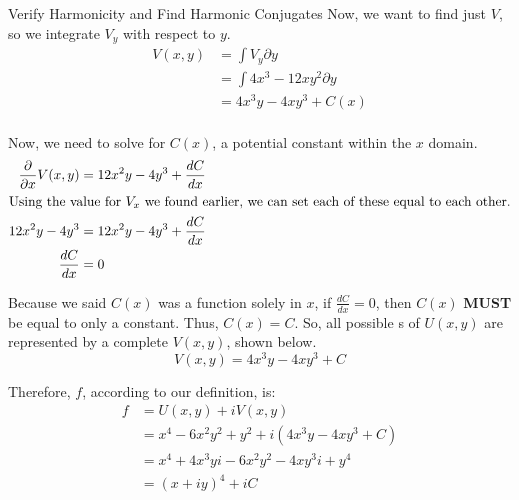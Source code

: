 \begin{example}{Verify Harmonicity and Find Harmonic Conjugates}
  Now, we want to find just $V$, so we integrate $V_{y}$ with respect to $y$.
  \begin{align*}
    V(x, y) &= \int V_{y} \partial y \\
            &= \int 4x^{3} - 12xy^{2} \partial y \\
            &= 4x^{3}y - 4xy^{3} + C(x) \\
  \end{align*}

  Now, we need to solve for $C(x)$, a potential constant within the $x$ domain.
  \begin{align*}
    \frac{\partial}{\partial x} V(x, y) &= 12x^{2}y - 4y^{3} + \frac{dC}{dx} \\
    \intertext{Using the value for $V_{x}$ we found earlier, we can set each of these equal to each other.}
    12x^{2}y - 4y^{3} &= 12x^{2}y - 4y^{3} + \frac{dC}{dx} \\
    \frac{dC}{dx} &= 0
  \end{align*}

  Because we said $C(x)$ was a function solely in $x$, if $\frac{dC}{dx} = 0$, then $C(x)$ \textbf{MUST} be equal to only a constant.
  Thus, $C(x) = C$.
  So, all possible s of $U(x, y)$ are represented by a complete $V(x, y)$, shown below.
  \begin{equation*}
    V(x, y) = 4x^{3}y - 4xy^{3} + C
  \end{equation*}

  Therefore, $f$, according to our definition, is:
  \begin{align*}
    f &= U(x, y) + iV(x, y) \\
      &= x^{4} - 6x^{2}y^{2} + y^{2} + i \left( 4x^{3}y - 4xy^{3} + C \right) \\
      &= x^{4} + 4x^{3}yi - 6x^{2}y^{2} - 4xy^{3}i + y^{4} \\
      &= {(x + iy)}^{4} + iC
  \end{align*}
\end{example}

